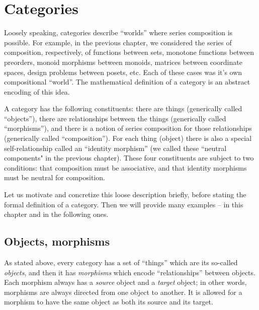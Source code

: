 
\section[Categories]{Categories}
\label{sec:formal-def-cats}



Loosely speaking, categories describe ``worlds'' where series composition is possible. For example, in the previous chapter, we considered the series of composition, respectively, of functions between sets, monotone functions between preorders, monoid morphisms between monoids, matrices between coordinate spaces, design problems between posets, etc. Each of these cases was it's own compositional ``world''.  The mathematical definition of a  category is an abstract encoding of this idea. 

A category has the following constituents: there are things (generically called ``objects''), there are relationships between the things (generically called ``morphisms''), and there is a notion of series composition for those relationships (generically called ``composition''). For each thing (object) there is also a special self-relationship called an ``identity morphism'' (we called these ``neutral components" in the previous chapter). These four constituents are subject to two conditions: that composition must be associative, and that identity morphisms must be neutral for composition.

Let us motivate and concretize this loose description briefly, before stating the formal definition of a category. Then we will provide many examples -- in this chapter and in the following ones. 

\subsection{Objects, morphisms}

As stated above, every category has a set of ``things'' which are its so-called \emph{objects}, and then it has \emph{morphisms} which encode ``relationships'' between objects. Each morphism always has a \emph{source} object and a \emph{target} object; in other words, morphisms are always directed from one object to another. It is allowed for a morphism to have the same object as both its source and its target. 

